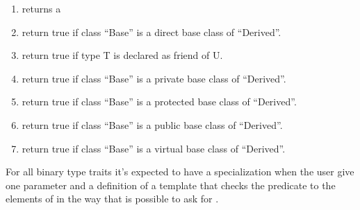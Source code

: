 \begin{enumerate}
\begin{enumerate}
\item {} returns a 
\item {} return true if class ``Base'' is a direct base class of ``Derived''. \item {} return true if type T is declared as friend of U.
\item {} return true if class ``Base'' is a private base class of ``Derived''.
\item {} return true if class ``Base'' is a protected base class of ``Derived''.
\item {} return true if class ``Base'' is a public base class of ``Derived''.
\item {} return true if class ``Base'' is a virtual base class of ``Derived''.
\end{enumerate}
For all binary type traits it's expected to have a specialization when the user give one parameter and a definition of a template  that checks the predicate to the elements of  in the way that is possible to ask for .
\end{enumerate}
